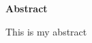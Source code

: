 
\clearemptydoublepage
{}




\vspace*{2cm}
{\Large \bf Abstract}
\vspace{1cm}

This is my abstract
